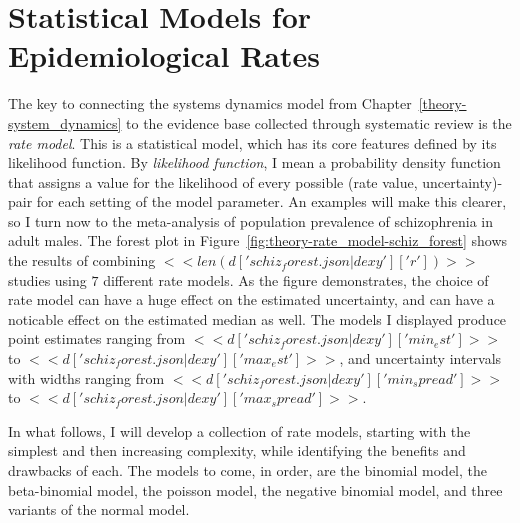 \section{Statistical Models for Epidemiological Rates}
\label{theory-rate_model}

The key to connecting the systems dynamics model from
Chapter~\ref{theory-system_dynamics} to the evidence base collected
through systematic review is the \emph{rate model}.  This is a
statistical model, which has its core features defined by its
likelihood function.  By \emph{likelihood function}, I mean a
probability density function that assigns a value for the likelihood
of every possible (rate value, uncertainty)-pair for each setting of
the model parameter.  An examples will make this clearer, so I turn
now to the meta-analysis of population prevalence of schizophrenia in
adult males.  The forest plot in
Figure~\ref{fig:theory-rate_model-schiz_forest} shows the results of
combining $<<len(d['schiz_forest.json|dexy']['r'])>>$ studies using
$7$ different rate models.  As the figure demonstrates, the choice of
rate model can have a huge effect on the estimated uncertainty, and
can have a noticable effect on the estimated median as well. The
models I displayed produce point estimates ranging from
$<<d['schiz_forest.json|dexy']['min_est']>>$ to
$<<d['schiz_forest.json|dexy']['max_est']>>$, and uncertainty
intervals with widths ranging from
$<<d['schiz_forest.json|dexy']['min_spread']>>$ to
$<<d['schiz_forest.json|dexy']['max_spread']>>$.

In what follows, I will develop a collection of rate models, starting
with the simplest and then increasing complexity, while identifying
the benefits and drawbacks of each.  The models to come, in order, are
the binomial model, the beta-binomial model, the poisson model, the
negative binomial model, and three variants of the normal
model.

